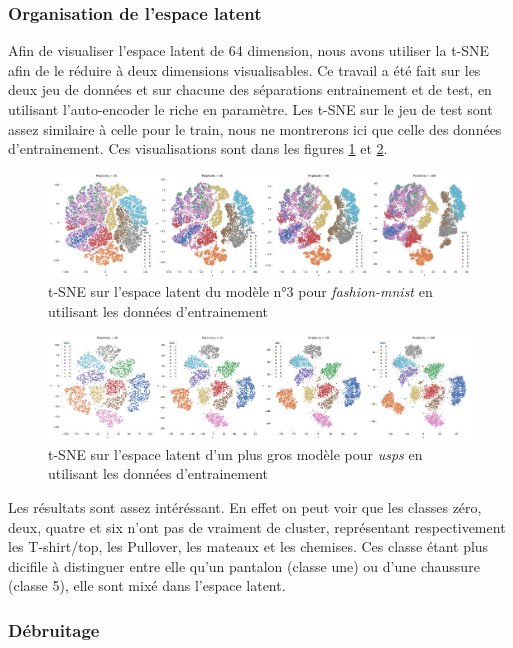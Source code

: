 \documentclass{article}
\begin{document}
\subsubsection{Organisation de l'espace latent}
Afin de visualiser l'espace latent de 64 dimension, nous avons utiliser la t-SNE afin de le réduire à deux dimensions visualisables. Ce travail a été fait sur les deux jeu de données et sur chacune des séparations entrainement et de test, en utilisant l'auto-encoder le riche en paramètre. Les t-SNE sur le jeu de test sont assez similaire à celle pour le train, nous ne montrerons ici que celle des données d'entrainement. Ces visualisations sont dans les figures \ref*{fig:tsneMnist} et \ref*{fig:tsneUsps}. 

\begin{figure}[htbp]
    \centering
    \includegraphics*[width=.75\textwidth]{tsne_mnist_train_big.pdf}
    \caption{t-SNE sur l'espace latent du modèle n°3 pour \textit{fashion-mnist} en utilisant les données d'entrainement}
    \label{fig:tsneMnist}
\end{figure}

\begin{figure}[htbp]
    \centering
    \includegraphics*[width=.75\textwidth]{tsne_usps_train_big.pdf}
    \caption{t-SNE sur l'espace latent d'un plus gros modèle pour \textit{usps} en utilisant les données d'entrainement}
    \label{fig:tsneUsps}
\end{figure}

Les résultats sont assez intéréssant. En effet on peut voir que les classes zéro, deux, quatre et six n'ont pas de vraiment de cluster, représentant respectivement les T-shirt/top, les Pullover, les mateaux et les chemises. Ces classe étant plus dicifile à distinguer entre elle qu'un pantalon (classe une) ou d'une chaussure (classe 5), elle sont mixé dans l'espace latent.



\subsubsection{Débruitage}
\end{document}
